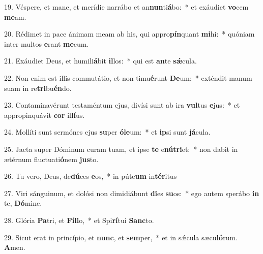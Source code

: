 19. Véspere, et mane, et merídie narrábo et an\textbf{nun}ti\textbf{á}bo:~*  et exáudiet \textbf{vo}cem \textbf{me}am.\

20. Rédimet in pace ánimam meam ab his, qui appro\textbf{pín}quant \textbf{mi}hi:~*  quóniam inter multos \textbf{e}rant \textbf{me}cum.\

21. Exáudiet Deus, et humili\textbf{á}bit \textbf{il}los:~*  qui est \textbf{an}te \textbf{sǽ}cula.\

22. Non enim est illis commutátio, et non timu\textbf{é}runt \textbf{De}um:~*  exténdit manum suam in re\textbf{tri}bu\textbf{én}do.\

23. Contaminavérunt testaméntum ejus, divísi sunt ab ira \textbf{vul}tus \textbf{e}jus:~*  et appropinquávit \textbf{cor} il\textbf{lí}us.\

24. Mollíti sunt sermónes ejus \textbf{su}per \textbf{ó}\textbf{le}um:~*  et \textbf{ip}si sunt \textbf{já}cula.\

25. Jacta super Dóminum curam tuam, et ipse \textbf{te} e\textbf{nú}\textbf{tri}et:~*  non dabit in ætérnum fluctuati\textbf{ó}nem \textbf{jus}to.\

26. Tu vero, Deus, de\textbf{dú}ces \textbf{e}os,~*  in púte\textbf{um} in\textbf{tér}itus\

27. Viri sánguinum, et dolósi non dimidiábunt \textbf{di}es \textbf{su}os:~*  ego autem sperábo \textbf{in} te, \textbf{Dó}mine.\

28. Glória \textbf{Pa}tri, et \textbf{Fí}\textbf{li}o,~*  et Spi\textbf{rí}tui \textbf{Sanc}to.\

29. Sicut erat in princípio, et \textbf{nunc}, et \textbf{sem}per,~*  et in sǽcula sæcu\textbf{ló}rum. \textbf{A}men.\


